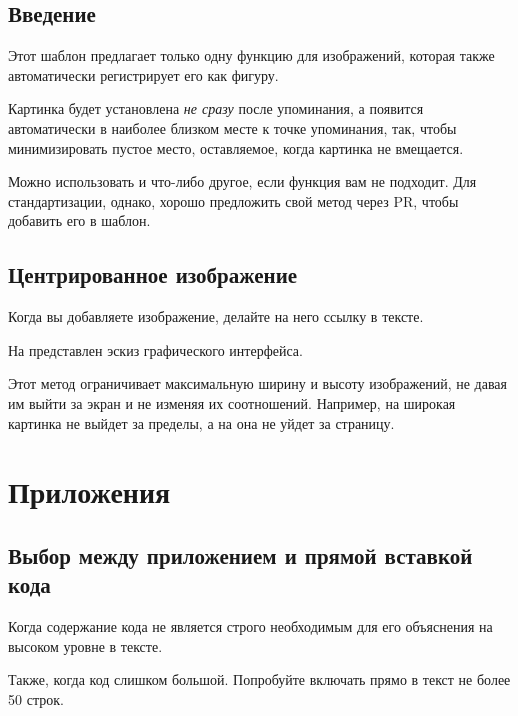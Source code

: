 \documentclass[a4paper,12pt]{report}
\begin{document}
\subsection{Введение}

Этот шаблон предлагает только одну функцию для изображений, 
которая также автоматически регистрирует его как фигуру.

Картинка будет установлена \textit{не сразу} после упоминания,
а появится автоматически в наиболее близком месте к точке упоминания,
так, чтобы минимизировать пустое место, 
оставляемое, когда картинка не вмещается.

Можно использовать и что-либо другое, если функция вам не подходит.
Для стандартизации, однако, хорошо предложить свой метод через \gls{PR}, чтобы добавить его в шаблон.

\subsection{Центрированное изображение}

Когда вы добавляете изображение, делайте на него ссылку в тексте.

На  представлен эскиз графического интерфейса.


Этот метод ограничивает максимальную ширину и высоту изображений, 
не давая им выйти за экран и не изменяя их соотношений.
Например, на  широкая картинка не выйдет за пределы,
а на  она не уйдет за страницу.



\section{Приложения}

\subsection{Выбор между приложением и прямой вставкой кода}

Когда содержание кода не является строго необходимым
для его объяснения на высоком уровне в тексте.

Также, когда код слишком большой.
Попробуйте включать прямо в текст не более 50 строк.
\end{document}
